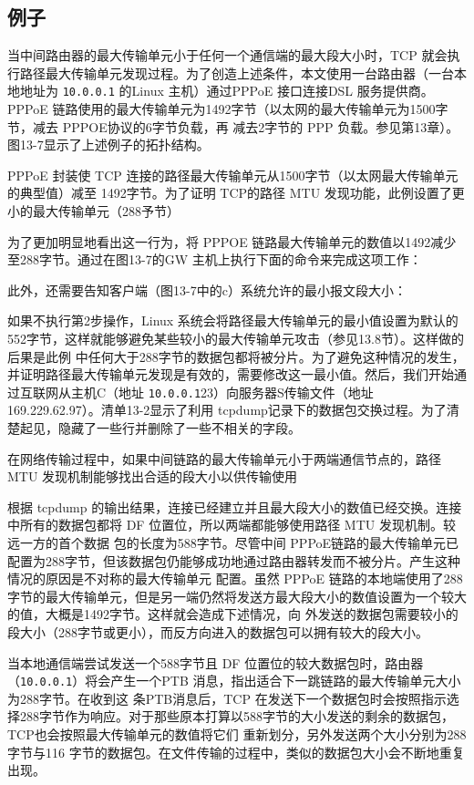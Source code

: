 \subsection{例子}
当中间路由器的最大传输单元小于任何一个通信端的最大段大小时，TCP 就会执行路径最大传输单元发现过程。为了创造上述条件，本文使用一台路由器（一台本地地址为
\verb|10.0.0.1| 的Linux 主机）通过PPPoE 接口连接DSL 服务提供商。PPPoE
链路使用的最大传输单元为1492字节（以太网的最大传输单元为1500字节，减去 PPPOE协议的6字节负载，再
减去2字节的 PPP 负载。参见第13章）。图13-7显示了上述例子的拓扑结构。

PPPoE 封装使 TCP 连接的路径最大传输单元从1500字节（以太网最大传输单元的典型值）减至
1492字节。为了证明 TCP的路径 MTU 发现功能，此例设置了更小的最大传输单元（288予节）

为了更加明显地看出这一行为，将 PPPOE 链路最大传输单元的数值以1492减少至288字节。通过在图13-7的GW 主机上执行下面的命令来完成这项工作：

此外，还需要告知客户端（图13-7中的c）系统允许的最小报文段大小：

如果不执行第2步操作，Linux
系统会将路径最大传输单元的最小值设置为默认的552字节，这样就能够避免某些较小的最大传输单元攻击（参见13.8节）。这样做的后果是此例
中任何大于288字节的数据包都将被分片。为了避免这种情况的发生，并证明路径最大传输单元发现是有效的，需要修改这一最小值。然后，我们开始通过互联网从主机C（地址
\verb|10.0.0.1|23）向服务器S传输文件（地址 169.229.62.97）。清单13-2显示了利用
tcpdump记录下的数据包交换过程。为了清楚起见，隐藏了一些行并删除了一些不相关的字段。

在网络传输过程中，如果中间链路的最大传输单元小于两端通信节点的，路径MTU 发现机制能够找出合适的段大小以供传输使用

根据 tcpdump 的输出结果，连接已经建立并且最大段大小的数值已经交换。连接中所有的数据包都将 DF 位置位，所以两端都能够使用路径
MTU 发现机制。较远一方的首个数据
包的长度为588字节。尽管中间
PPPoE链路的最大传输单元已配置为288字节，但该数据包仍能够成功地通过路由器转发而不被分片。产生这种情况的原因是不对称的最大传输单元
配置。虽然 PPPoE
链路的本地端使用了288字节的最大传输单元，但是另一端仍然将发送方最大段大小的数值设置为一个较大的值，大概是1492字节。这样就会造成下述情况，向
外发送的数据包需要较小的段大小（288字节或更小），而反方向进入的数据包可以拥有较大的段大小。

当本地通信端尝试发送一个588字节且 DF 位置位的较大数据包时，路由器（\verb|10.0.0.1|）将会产生一个PTB
消息，指出适合下一跳链路的最大传输单元大小为288字节。在收到这
条PTB消息后，TCP
在发送下一个数据包时会按照指示选择288字节作为响应。对于那些原本打算以588字节的大小发送的剩余的数据包，TCP也会按照最大传输单元的数值将它们
重新划分，另外发送两个大小分别为288 字节与116 字节的数据包。在文件传输的过程中，类似的数据包大小会不断地重复出现。

